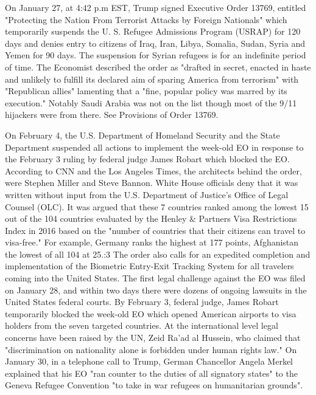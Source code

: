 On January 27, at 4:42 p.m EST, Trump signed Executive Order 13769,
entitled "Protecting the Nation From Terrorist Attacks by Foreign
Nationals" which temporarily suspends the U. S. Refugee Admissions
Program (USRAP) for 120 days and denies entry to citizens of Iraq, Iran,
Libya, Somalia, Sudan, Syria and Yemen for 90 days. The suspension for
Syrian refugees is for an indefinite period of time. The Economist
described the order as "drafted in secret, enacted in haste and unlikely
to fulfill its declared aim of sparing America from terrorism" with
"Republican allies" lamenting that a "fine, popular policy was marred by
its execution." Notably Saudi Arabia was not on the list though most of
the 9/11 hijackers were from there. See Provisions of Order 13769.

On February 4, the U.S. Department of Homeland Security and the State
Department suspended all actions to implement the week-old EO in
response to the February 3 ruling by federal judge James Robart which
blocked the EO. According to CNN and the Los Angeles Times, the
architects behind the order, were Stephen Miller and Steve Bannon. White
House officials deny that it was written without input from the U.S.
Department of Justice's Office of Legal Counsel (OLC). It was argued
that these 7 countries ranked among the lowest 15 out of the 104
countries evaluated by the Henley \& Partners Visa Restrictions Index in
2016 based on the "number of countries that their citizens can travel to
visa-free." For example, Germany ranks the highest at 177 points,
Afghanistan the lowest of all 104 at 25.:3 The order also calls for an
expedited completion and implementation of the Biometric Entry-Exit
Tracking System for all travelers coming into the United States. The
first legal challenge against the EO was filed on January 28, and within
two days there were dozens of ongoing lawsuits in the United States
federal courts. By February 3, federal judge, James Robart temporarily
blocked the week-old EO which opened American airports to visa holders
from the seven targeted countries. At the international level legal
concerns have been raised by the UN, Zeid Ra'ad al Hussein, who claimed
that "discrimination on nationality alone is forbidden under human
rights law." On January 30, in a telephone call to Trump, German
Chancellor Angela Merkel explained that his EO "ran counter to the
duties of all signatory states" to the Geneva Refugee Convention "to
take in war refugees on humanitarian grounds".


